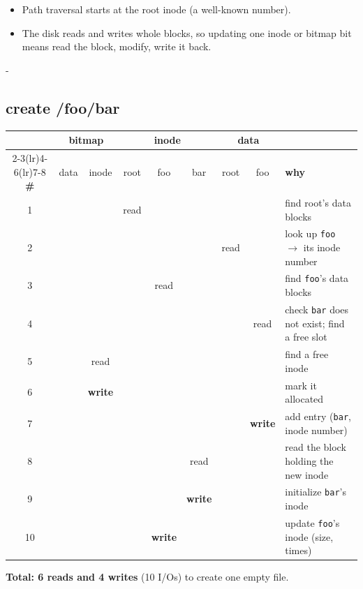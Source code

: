 \documentclass[11pt,a4paper]{article}
\makeatletter
\newcommand{\keepspace}[1]{\par\penalty-100\begingroup
  \setlength{\dimen@}{#1}\dimen@ii\pagegoal\advance\dimen@ii-\pagetotal
  \ifdim\dimen@>\dimen@ii\ifdim\dimen@ii>\z@\vfil\fi\break\fi\endgroup}
\makeatother
\begin{document}
\begin{warnbox}
\begin{itemize}
  \item Path traversal starts at the root inode (a well-known number).
  \item The disk reads and writes whole blocks, so updating one inode or bitmap
        bit means read the block, modify, write it back.
\end{itemize}
\end{warnbox}

\keepspace{22\baselineskip}
\subsection{create /foo/bar}

\begin{quizbox}
\begin{center}
\small
\setlength{\tabcolsep}{3.5pt}
\renewcommand{\arraystretch}{1.18}
\begin{tabularx}{\linewidth}{@{}c*{7}{c}X@{}}
  \toprule
  & \multicolumn{2}{c}{\textbf{bitmap}} & \multicolumn{3}{c}{\textbf{inode}} & \multicolumn{2}{c}{\textbf{data}} & \\
  \cmidrule(lr){2-3}\cmidrule(lr){4-6}\cmidrule(lr){7-8}
  \textbf{\#} & data & inode & root & foo & bar & root & foo & \textbf{why} \\
  \midrule
  1  &  &  & read &  &  &  &  & find root's data blocks \\
  2  &  &  &  &  &  & read &  & look up \texttt{foo} \(\to\) its inode number \\
  3  &  &  &  & read &  &  &  & find \texttt{foo}'s data blocks \\
  4  &  &  &  &  &  &  & read & check \texttt{bar} does not exist; find a free slot \\
  5  &  & read &  &  &  &  &  & find a free inode \\
  6  &  & \textbf{write} &  &  &  &  &  & mark it allocated \\
  7  &  &  &  &  &  &  & \textbf{write} & add entry (\texttt{bar}, inode number) \\
  8  &  &  &  &  & read &  &  & read the block holding the new inode \\
  9  &  &  &  &  & \textbf{write} &  &  & initialize \texttt{bar}'s inode \\
  10 &  &  &  & \textbf{write} &  &  &  & update \texttt{foo}'s inode (size, times) \\
  \bottomrule
\end{tabularx}
\end{center}

\noindent\textbf{Total: 6 reads and 4 writes} (10 I/Os) to create one empty file.
\end{quizbox}
\end{document}

